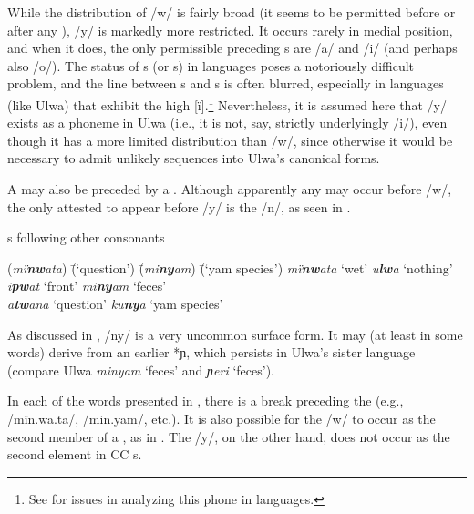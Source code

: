 While the distribution of /w/ is fairly broad (it seems to be permitted before or after any ), /y/ is markedly more restricted. It occurs rarely in medial position, and when it does, the only permissible preceding s are /a/ and /i/ (and perhaps also /o/). The status of s (or s) in  languages poses a notoriously difficult problem, and the line between s and s is often blurred, especially in languages (like Ulwa) that exhibit the high  [ï].\footnote{See \citet[50--52]{Foley1986} for issues in analyzing this phone in  languages.} Nevertheless, it is assumed here that /y/ exists as a phoneme in Ulwa (i.e., it is not, say, strictly underlyingly /i/), even though it has a more limited distribution than /w/, since otherwise it would be necessary to admit unlikely  sequences into Ulwa’s canonical forms.

  A  may also be preceded by a . Although apparently any  may occur before /w/, the only attested  to appear before /y/ is the   /n/, as seen in .

\ea%
    \label{ex:phon:40}
          s following other consonants\\
\begin{tabbing}
{(\textit{mï\textbf{nw}ata})} \= {(‘question’)} \= {(\textit{mi\textbf{ny}am})} \= {(‘yam species’)}\kill
{\textit{mï\textbf{nw}ata}} \> {‘wet’} \> {\textit{u\textbf{lw}a}} \> {‘nothing’}\\
{\textit{i\textbf{pw}at}} \> {‘front’} \> {\textit{mi\textbf{ny}am}} \> {‘feces’}\\
{\textit{a\textbf{tw}ana}} \> {‘question’} \> {\textit{ku\textbf{ny}a}} \> {‘yam species’}
\end{tabbing}
\z

As discussed in , /ny/ is a very uncommon surface form. It may (at least in some words) derive from an earlier   *ɲ, which persists in Ulwa’s sister language  (compare Ulwa \textit{minyam} ‘feces’ and  \textit{ɲeri} ‘feces’).

In each of the words presented in , there is a  break preceding the  (e.g., /mïn.wa.ta/, /min.yam/, etc.). It is also possible for the   /w/ to occur as the second member of a , as in . The   /y/, on the other hand, does not occur as the second element in CC s.

